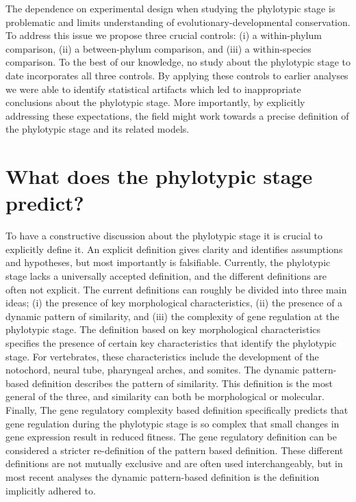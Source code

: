 The dependence on experimental design when studying the phylotypic stage is problematic and limits understanding of evolutionary-developmental conservation. To address this issue we propose three crucial controls: (i) a within-phylum comparison, (ii) a between-phylum comparison, and (iii) a within-species comparison. To the best of our knowledge, no study about the phylotypic stage to date incorporates all three controls. By applying these controls to earlier analyses we were able to identify statistical artifacts which led to inappropriate conclusions about the phylotypic stage. More importantly, by explicitly addressing these expectations, the field might work towards a precise definition of the phylotypic stage and its related models.

\section{What does the phylotypic stage predict?}

To have a constructive discussion about the phylotypic stage it is crucial to explicitly define it. An explicit definition gives clarity and identifies assumptions and hypotheses, but most importantly is falsifiable. Currently, the phylotypic stage lacks a universally accepted definition, and the different definitions are often not explicit. The current definitions can roughly be divided into three main ideas; (i) the presence of key morphological characteristics, (ii) the presence of a dynamic pattern of similarity, and (iii) the complexity of gene regulation at the phylotypic stage\cite{OlafRP2003}. The definition based on key morphological characteristics specifies the presence of certain key characteristics that identify the phylotypic stage. For vertebrates, these characteristics include the development of the notochord, neural tube, pharyngeal arches, and somites\cite{Kimmel1995}. The dynamic pattern-based definition describes the pattern of similarity. This definition is the most general of the three, and similarity can both be morphological or molecular\cite{Slack1993,Duboule1994}. Finally, The gene regulatory complexity based definition specifically predicts that gene regulation during the phylotypic stage is so complex that small changes in gene expression result in reduced fitness\cite{raff1996}. The gene regulatory definition can be considered a stricter re-definition of the pattern based definition. These different definitions are not mutually exclusive and are often used interchangeably, but in most recent analyses the dynamic pattern-based definition is the definition implicitly adhered to.


